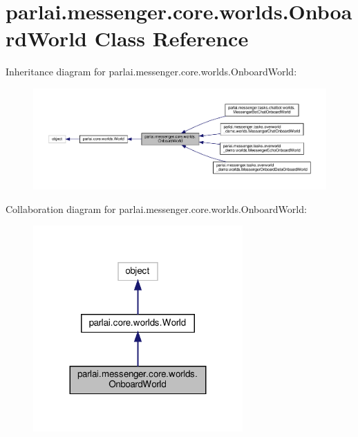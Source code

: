 \hypertarget{classparlai_1_1messenger_1_1core_1_1worlds_1_1OnboardWorld}{}\section{parlai.\+messenger.\+core.\+worlds.\+Onboard\+World Class Reference}
\label{classparlai_1_1messenger_1_1core_1_1worlds_1_1OnboardWorld}


Inheritance diagram for parlai.\+messenger.\+core.\+worlds.\+Onboard\+World\+:
\nopagebreak
\begin{figure}[H]
\begin{center}
\leavevmode
\includegraphics[width=350pt]{classparlai_1_1messenger_1_1core_1_1worlds_1_1OnboardWorld__inherit__graph}
\end{center}
\end{figure}


Collaboration diagram for parlai.\+messenger.\+core.\+worlds.\+Onboard\+World\+:
\nopagebreak
\begin{figure}[H]
\begin{center}
\leavevmode
\includegraphics[width=227pt]{classparlai_1_1messenger_1_1core_1_1worlds_1_1OnboardWorld__coll__graph}
\end{center}
\end{figure}

